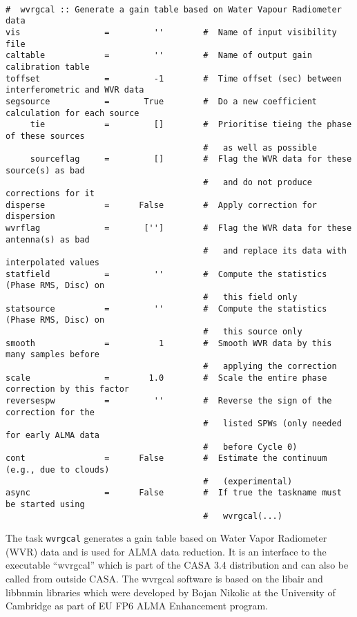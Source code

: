 {\small
\begin{verbatim}

#  wvrgcal :: Generate a gain table based on Water Vapour Radiometer data
vis                 =         ''        #  Name of input visibility file
caltable            =         ''        #  Name of output gain calibration table
toffset             =         -1        #  Time offset (sec) between interferometric and WVR data
segsource           =       True        #  Do a new coefficient calculation for each source
     tie            =         []        #  Prioritise tieing the phase of these sources
                                        #   as well as possible 
     sourceflag     =         []        #  Flag the WVR data for these source(s) as bad
                                        #   and do not produce corrections for it
disperse            =      False        #  Apply correction for dispersion
wvrflag             =       ['']        #  Flag the WVR data for these antenna(s) as bad
                                        #   and replace its data with interpolated values
statfield           =         ''        #  Compute the statistics (Phase RMS, Disc) on
                                        #   this field only
statsource          =         ''        #  Compute the statistics (Phase RMS, Disc) on
                                        #   this source only
smooth              =          1        #  Smooth WVR data by this many samples before
                                        #   applying the correction
scale               =        1.0        #  Scale the entire phase correction by this factor
reversespw          =         ''        #  Reverse the sign of the correction for the
                                        #   listed SPWs (only needed for early ALMA data
                                        #   before Cycle 0)
cont                =      False        #  Estimate the continuum (e.g., due to clouds)
                                        #   (experimental)
async               =      False        #  If true the taskname must be started using
                                        #   wvrgcal(...)
\end{verbatim}
\normalsize

The task {\tt wvrgcal} generates a gain table based on Water Vapor
Radiometer (WVR) data and is used for ALMA data reduction. It is an interface to the executable
``wvrgcal'' which is part of the CASA 3.4 distribution and can also be called from outside
CASA. The wvrgcal software is based on the libair and libbnmin libraries which were developed
by Bojan Nikolic at the University of Cambridge as part of EU FP6 ALMA Enhancement program.

}
